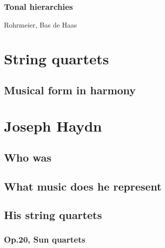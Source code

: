     \subsubsection{Tonal hierarchies}
    Rohrmeier, Bas de Haas
\section{String quartets}
  \subsection{Musical form in harmony}
\section{Joseph Haydn}
  \subsection{Who was}
  \subsection{What music does he represent}
  \subsection{His string quartets}
    \subsubsection{Op.20, Sun quartets}

\newpage

